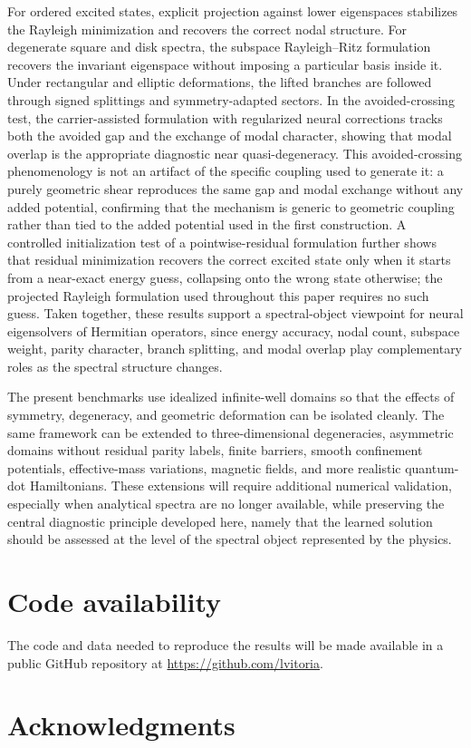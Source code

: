 \documentclass[10pt,onecolumn]{article}
\begin{document}
For ordered excited states, explicit projection against lower eigenspaces stabilizes the Rayleigh minimization and recovers the correct nodal structure. For degenerate square and disk spectra, the subspace Rayleigh--Ritz formulation recovers the invariant eigenspace without imposing a particular basis inside it. Under rectangular and elliptic deformations, the lifted branches are followed through signed splittings and symmetry-adapted sectors. In the avoided-crossing test, the carrier-assisted formulation with regularized neural corrections tracks both the avoided gap and the exchange of modal character, showing that modal overlap is the appropriate diagnostic near quasi-degeneracy. This avoided-crossing phenomenology is not an artifact of the specific coupling used to generate it: a purely geometric shear reproduces the same gap and modal exchange without any added potential, confirming that the mechanism is generic to geometric coupling rather than tied to the added potential used in the first construction. A controlled initialization test of a pointwise-residual formulation further shows that residual minimization recovers the correct excited state only when it starts from a near-exact energy guess, collapsing onto the wrong state otherwise; the projected Rayleigh formulation used throughout this paper requires no such guess. Taken together, these results support a spectral-object viewpoint for neural eigensolvers of Hermitian operators, since energy accuracy, nodal count, subspace weight, parity character, branch splitting, and modal overlap play complementary roles as the spectral structure changes.

The present benchmarks use idealized infinite-well domains so that the effects of symmetry, degeneracy, and geometric deformation can be isolated cleanly. The same framework can be extended to three-dimensional degeneracies, asymmetric domains without residual parity labels, finite barriers, smooth confinement potentials, effective-mass variations, magnetic fields, and more realistic quantum-dot Hamiltonians. These extensions will require additional numerical validation, especially when analytical spectra are no longer available, while preserving the central diagnostic principle developed here, namely that the learned solution should be assessed at the level of the spectral object represented by the physics.

\section*{Code availability}

The code and data needed to reproduce the results will be made available in a public GitHub repository at \url{https://github.com/lvitoria}.

\section*{Acknowledgments}





\end{document}
